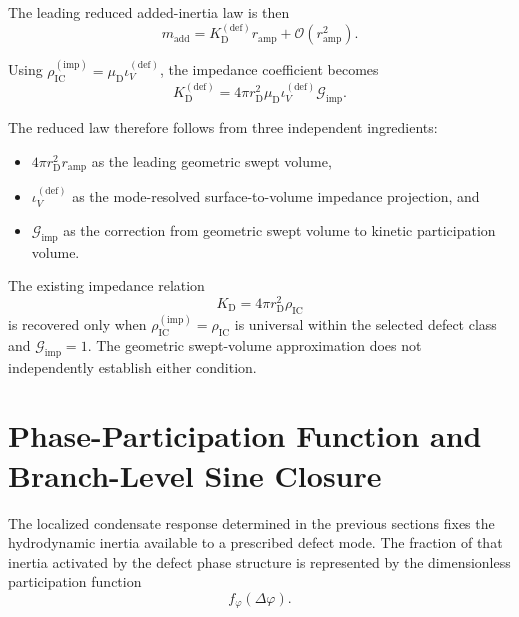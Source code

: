 The leading reduced added-inertia law is then
\begin{equation}
    \boxed{ m_{\mathrm{add}} = K_{\mathrm{D}}^{(\mathrm{def})} r_{\mathrm{amp}} + \mathcal{O} \left( r_{\mathrm{amp}}^2 \right) }.
\end{equation}

Using $\rho_{\mathrm{IC}}^{(\mathrm{imp})} = \mu_{\mathrm{D}} \iota_V^{(\mathrm{def})}$, the impedance coefficient becomes
\begin{equation}
    K_{\mathrm{D}}^{(\mathrm{def})} = 4\pi r_{\mathrm{D}}^2 \mu_{\mathrm{D}} \iota_V^{(\mathrm{def})} \mathcal{G}_{\mathrm{imp}}.
\end{equation}

The reduced law therefore follows from three independent ingredients:
\begin{itemize}
    \item $4\pi r_{\mathrm{D}}^2r_{\mathrm{amp}}$ as the leading geometric swept volume,
    \item $\iota_V^{(\mathrm{def})}$ as the mode-resolved surface-to-volume impedance projection, and
    \item $\mathcal{G}_{\mathrm{imp}}$ as the correction from geometric swept volume to kinetic participation volume.
\end{itemize}

The existing impedance relation
\begin{equation}
    K_{\mathrm{D}} = 4\pi r_{\mathrm{D}}^2\rho_{\mathrm{IC}}
\end{equation}
is recovered only when $\rho_{\mathrm{IC}}^{(\mathrm{imp})} = \rho_{\mathrm{IC}}$ is universal within the selected defect class and $\mathcal{G}_{\mathrm{imp}}=1$. The geometric swept-volume approximation does not independently establish either condition.

\section{Phase-Participation Function and Branch-Level Sine Closure}

The localized condensate response determined in the previous sections fixes the hydrodynamic inertia available to a prescribed defect mode. The fraction of that inertia activated by the defect phase structure is represented by the dimensionless participation function
\begin{equation}
    f_{\varphi}(\Delta\varphi).
\end{equation}

